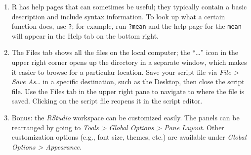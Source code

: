 \documentclass[letterpaper,12pt,twoside,]{pinp}
\begin{document}
\begin{enumerate}
\begin{Shaded}
\begin{Highlighting}[]
\end{Highlighting}
\end{Shaded}
\item
  \textsf{R} has help pages that can sometimes be useful; they typically
  contain a basic description and include syntax information. To look up
  what a certain function does, use \texttt{?}; for example, run
  \texttt{?mean} and the help page for the \texttt{mean} will appear in
  the Help tab on the bottom right.
\item
  The Files tab shows all the files on the local computer; the
  ``\ldots{}'' icon in the upper right corner opens up the directory in
  a separate window, which makes it easier to browse for a particular
  location. Save your script file via \emph{File \textgreater{} Save
  As\ldots{}} in a specific destination, such as the Desktop, then close
  the script file. Use the Files tab in the upper right pane to navigate
  to where the file is saved. Clicking on the script file reopens it in
  the script editor.
\item
  Bonus: the \emph{RStudio} workspace can be customized easily. The
  panels can be rearranged by going to \emph{Tools \textgreater{} Global
  Options \textgreater{} Pane Layout}. Other customization options
  (e.g., font size, themes, etc.) are available under \emph{Global
  Options \textgreater{} Appearance}.
\end{enumerate}

\end{document}

